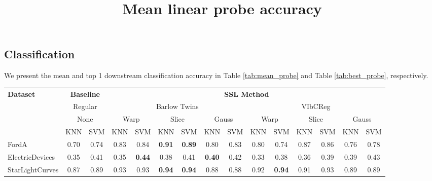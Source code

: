 \documentclass[../../thesis.tex]{subfiles}
\begin{document}
\subsection{Classification}

We present the mean and top 1 downstream classification accuracy in Table \ref{tab:mean_probe} and Table \ref{tab:best_probe}, respectively. 


\begin{table}[h]
    \centering
    \title{Mean linear probe accuracy}
    \begin{adjustbox}{width=\textwidth}
    \begin{tabular}{lcc|cc|cc|cc|cc|cc|cc} %
        \toprule
        \multirow{4}{*}{\textbf{Dataset}} & \multicolumn{2}{c}{\textbf{Baseline}} & \multicolumn{12}{c}{\textbf{SSL Method}} \\
                                            \cmidrule(lr){2-3} \cmidrule(lr){4-15}
                                          & \multicolumn{2}{c}{Regular}           & \multicolumn{6}{c}{Barlow Twins}                                                 &  \multicolumn{6}{c}{VIbCReg} \\
                                          \cmidrule(lr){2-3} \cmidrule(lr){4-9} \cmidrule(lr){10-15}
                                          &   \multicolumn{2}{c}{None}            & \multicolumn{2}{c}{Warp}  & \multicolumn{2}{c}{Slice} & \multicolumn{2}{c}{Gauss} & \multicolumn{2}{c}{Warp} & \multicolumn{2}{c}{Slice} & \multicolumn{2}{c}{Gauss} \\
                                          \cmidrule(lr){2-3} \cmidrule(lr){4-5} \cmidrule(lr){6-7} \cmidrule(lr){8-9} \cmidrule(lr){10-11} \cmidrule(lr){12-13}\cmidrule(lr){14-15}
                                          & KNN & SVM                               & KNN & SVM                  & KNN & SVM                & KNN & SVM                 & KNN & SVM                 & KNN & SVM                 & KNN & SVM   \\
        \midrule
        FordA                   & 0.70 & 0.74 & 0.83 & 0.84 & \textbf{0.91} & \textbf{0.89} & 0.80 & 0.83 & 0.80 & 0.74 & 0.87 & 0.86 & 0.76 & 0.78 \\
        ElectricDevices         & 0.35 & 0.41 & 0.35 & \textbf{0.44} & 0.38 & 0.41 & \textbf{0.40} & 0.42 & 0.33 & 0.38 & 0.36 & 0.39 & 0.39 & 0.43 \\
        StarLightCurves         & 0.87 & 0.89 & 0.93 & 0.93 & \textbf{0.94} & \textbf{0.94} & 0.88 & 0.88 & 0.92 & \textbf{0.94} & 0.91 & 0.93 & 0.89 & 0.89 \\

\end{tabular}
\end{adjustbox}
\end{table}
\end{document}
